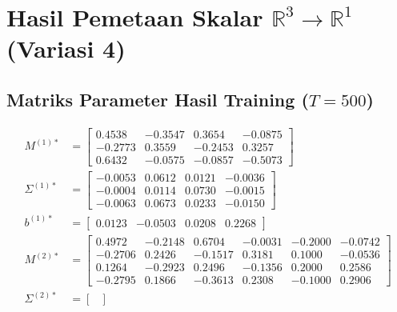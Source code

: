 \documentclass[11pt,a4paper]{article}
\def\mathbf#1{#1}%
\theoremstyle{plain}
\theoremstyle{definition}
\theoremstyle{remark}
\begin{document}
\clearpage
\section{Hasil Pemetaan Skalar \texorpdfstring{$\mathbb{R}^3 \to \mathbb{R}^1$}{R3 -> R1} (Variasi 4)}
\label{sec:subkasus_1}

\subsection{Matriks Parameter Hasil Training (\texorpdfstring{$T = 500$}{T = 500})}
\label{subsec:params_r1}

\begin{align}
    M^{(1)*} &= \begin{bmatrix}
         0.4538 & -0.3547 &  0.3654 & -0.0875 \\
        -0.2773 &  0.3559 & -0.2453 &  0.3257 \\
         0.6432 & -0.0575 & -0.0857 & -0.5073
    \end{bmatrix} \label{eq:opt_m1_r1} \\[0.2em]
    \Sigma^{(1)*} &= \begin{bmatrix}
        -0.0053 &  0.0612 &  0.0121 & -0.0036 \\
        -0.0004 &  0.0114 &  0.0730 & -0.0015 \\
        -0.0063 &  0.0673 &  0.0233 & -0.0150
    \end{bmatrix} \label{eq:opt_s1_r1} \\[0.2em]
    \mathbf{b}^{(1)*} &= \begin{bmatrix} 0.0123 & -0.0503 & 0.0208 & 0.2268 \end{bmatrix} \label{eq:opt_b1_r1} \\[0.4em]
    M^{(2)*} &= \begin{bmatrix}
         0.4972 & -0.2148 &  0.6704 & -0.0031 & -0.2000 & -0.0742 \\
        -0.2706 &  0.2426 & -0.1517 &  0.3181 &  0.1000 & -0.0536 \\
         0.1264 & -0.2923 &  0.2496 & -0.1356 &  0.2000 &  0.2586 \\
        -0.2795 &  0.1866 & -0.3613 &  0.2308 & -0.1000 &  0.2906
    \end{bmatrix} \label{eq:opt_m2_r1} \\[0.2em]
    \Sigma^{(2)*} &= \begin{bmatrix}

\end{bmatrix}
\end{align}
\end{document}
